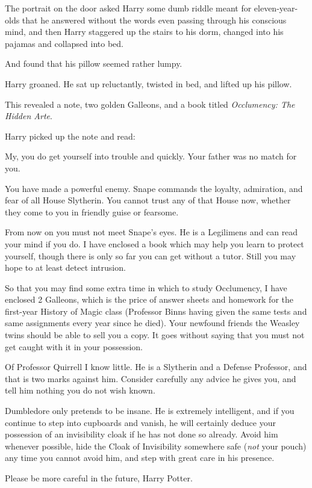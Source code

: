 The portrait on the door asked Harry some dumb riddle meant for eleven-year-olds that he answered without the words even passing through his conscious mind, and then Harry staggered up the stairs to his dorm, changed into his pajamas and collapsed into bed.

And found that his pillow seemed rather lumpy.

Harry groaned. He sat up reluctantly, twisted in bed, and lifted up his pillow.

This revealed a note, two golden Galleons, and a book titled \emph{Occlumency: The Hidden Arte}.

Harry picked up the note and read:

\begin{writtenNote}
My, you do get yourself into trouble and quickly. Your father was no match for you.

You have made a powerful enemy. Snape commands the loyalty, admiration, and fear of all House Slytherin. You cannot trust any of that House now, whether they come to you in friendly guise or fearsome.

From now on you must not meet Snape's eyes. He is a Legilimens and can read your mind if you do. I have enclosed a book which may help you learn to protect yourself, though there is only so far you can get without a tutor. Still you may hope to at least detect intrusion.

So that you may find some extra time in which to study Occlumency, I have enclosed 2 Galleons, which is the price of answer sheets and homework for the first-year History of Magic class (Professor Binns having given the same tests and same assignments every year since he died). Your newfound friends the Weasley twins should be able to sell you a copy. It goes without saying that you must not get caught with it in your possession.

Of Professor Quirrell I know little. He is a Slytherin and a Defense Professor, and that is two marks against him. Consider carefully any advice he gives you, and tell him nothing you do not wish known.

Dumbledore only pretends to be insane. He is extremely intelligent, and if you continue to step into cupboards and vanish, he will certainly deduce your possession of an invisibility cloak if he has not done so already. Avoid him whenever possible, hide the Cloak of Invisibility somewhere safe (\emph{not} your pouch) any time you cannot avoid him, and step with great care in his presence.

Please be more careful in the future, Harry Potter.

\end{writtenNote}

